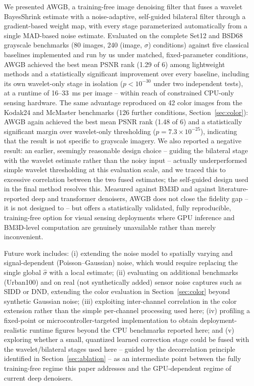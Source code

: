 \documentclass[final,3p,times,twocolumn,nopreprintline]{elsarticle}
\begin{document}
We presented AWGB, a training-free image denoising filter that fuses a wavelet BayesShrink estimate with a noise-adaptive, self-guided bilateral filter through a gradient-based weight map, with every stage parameterized automatically from a single MAD-based noise estimate. Evaluated on the complete Set12 and BSD68 grayscale benchmarks (80 images, 240 (image, $\sigma$) conditions) against five classical baselines implemented and run by us under matched, fixed-parameter conditions, AWGB achieved the best mean PSNR rank (1.29 of 6) among lightweight methods and a statistically significant improvement over every baseline, including its own wavelet-only stage in isolation ($p<10^{-30}$ under two independent tests), at a runtime of 16--33~ms per image -- within reach of constrained CPU-only sensing hardware. The same advantage reproduced on 42 color images from the Kodak24 and McMaster benchmarks (126 further conditions, Section~\ref{sec:color}): AWGB again achieved the best mean PSNR rank (1.48 of 6) and a statistically significant margin over wavelet-only thresholding ($p=7.3\times10^{-25}$), indicating that the result is not specific to grayscale imagery. We also reported a negative result: an earlier, seemingly reasonable design choice -- guiding the bilateral stage with the wavelet estimate rather than the noisy input -- actually underperformed simple wavelet thresholding at this evaluation scale, and we traced this to excessive correlation between the two fused estimates; the self-guided design used in the final method resolves this. Measured against BM3D and against literature-reported deep and transformer denoisers, AWGB does not close the fidelity gap -- it is not designed to -- but offers a statistically validated, fully reproducible, training-free option for visual sensing deployments where GPU inference and BM3D-level computation are genuinely unavailable rather than merely inconvenient.

Future work includes: (i) extending the noise model to spatially varying and signal-dependent (Poisson--Gaussian) noise, which would require replacing the single global $\hat\sigma$ with a local estimate; (ii) evaluating on additional benchmarks (Urban100) and on real (not synthetically added) sensor noise captures such as SIDD or DND, extending the color evaluation in Section~\ref{sec:color} beyond synthetic Gaussian noise; (iii) exploiting inter-channel correlation in the color extension rather than the simple per-channel processing used here; (iv) profiling a fixed-point or microcontroller-targeted implementation to obtain deployment-realistic runtime figures beyond the CPU benchmarks reported here; and (v) exploring whether a small, quantized learned correction stage could be fused with the wavelet/bilateral stages used here -- guided by the decorrelation principle identified in Section~\ref{sec:ablation} -- as an intermediate point between the fully training-free regime this paper addresses and the GPU-dependent regime of current deep denoisers.
\end{document}
